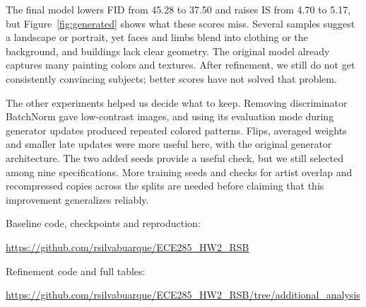 \documentclass{article}
\begin{document}
The final model lowers FID from 45.28 to 37.50 and raises IS from 4.70 to 5.17,
but Figure~\ref{fig:generated} shows what these scores miss. Several samples
suggest a landscape or portrait, yet faces and limbs blend into clothing or
the background, and buildings lack clear geometry. The original model already
captures many painting colors and textures. After refinement, we still do not
get consistently convincing subjects; better scores have not solved that problem.

The other experiments helped us decide what to keep. Removing discriminator
BatchNorm gave low-contrast images, and using its evaluation mode during
generator updates produced repeated colored patterns. Flips, averaged weights
and smaller late updates were more useful here, with the original generator
architecture. The two added seeds provide a useful check, but we still selected
among nine specifications. More training seeds and checks for artist overlap
and recompressed copies across the splits are needed before claiming that this
improvement generalizes reliably.

Baseline code, checkpoints and reproduction:\par
\url{https://github.com/rsilvabuarque/ECE285_HW2_RSB}\par
Refinement code and full tables:\par
\url{https://github.com/rsilvabuarque/ECE285_HW2_RSB/tree/additional_analysis}
\end{document}
